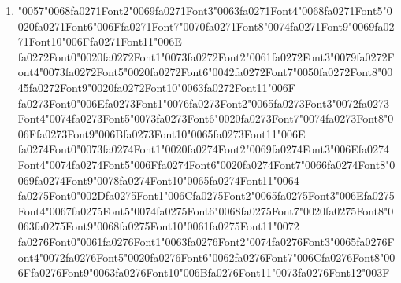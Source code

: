 \documentclass[12pt]{article}
\begin{document}
\begin{enumerate}[label=Q\arabic*.]
 \item {\char"0057}{\char"0068}{\csname fa0271Font2\endcsname\char"0069}{\csname fa0271Font3\endcsname\char"0063}{\csname fa0271Font4\endcsname\char"0068}{\csname fa0271Font5\endcsname\char"0020}{\csname fa0271Font6\endcsname\char"006F}{\csname fa0271Font7\endcsname\char"0070}{\csname fa0271Font8\endcsname\char"0074}{\csname fa0271Font9\endcsname\char"0069}{\csname fa0271Font10\endcsname\char"006F}{\csname fa0271Font11\endcsname\char"006E} {\csname fa0272Font0\endcsname\char"0020}{\csname fa0272Font1\endcsname\char"0073}{\csname fa0272Font2\endcsname\char"0061}{\csname fa0272Font3\endcsname\char"0079}{\csname fa0272Font4\endcsname\char"0073}{\csname fa0272Font5\endcsname\char"0020}{\csname fa0272Font6\endcsname\char"0042}{\csname fa0272Font7\endcsname\char"0050}{\csname fa0272Font8\endcsname\char"0045}{\csname fa0272Font9\endcsname\char"0020}{\csname fa0272Font10\endcsname\char"0063}{\csname fa0272Font11\endcsname\char"006F} {\csname fa0273Font0\endcsname\char"006E}{\csname fa0273Font1\endcsname\char"0076}{\csname fa0273Font2\endcsname\char"0065}{\csname fa0273Font3\endcsname\char"0072}{\csname fa0273Font4\endcsname\char"0074}{\csname fa0273Font5\endcsname\char"0073}{\csname fa0273Font6\endcsname\char"0020}{\csname fa0273Font7\endcsname\char"0074}{\csname fa0273Font8\endcsname\char"006F}{\csname fa0273Font9\endcsname\char"006B}{\csname fa0273Font10\endcsname\char"0065}{\csname fa0273Font11\endcsname\char"006E} {\csname fa0274Font0\endcsname\char"0073}{\csname fa0274Font1\endcsname\char"0020}{\csname fa0274Font2\endcsname\char"0069}{\csname fa0274Font3\endcsname\char"006E}{\csname fa0274Font4\endcsname\char"0074}{\csname fa0274Font5\endcsname\char"006F}{\csname fa0274Font6\endcsname\char"0020}{\csname fa0274Font7\endcsname\char"0066}{\csname fa0274Font8\endcsname\char"0069}{\csname fa0274Font9\endcsname\char"0078}{\csname fa0274Font10\endcsname\char"0065}{\csname fa0274Font11\endcsname\char"0064} {\csname fa0275Font0\endcsname\char"002D}{\csname fa0275Font1\endcsname\char"006C}{\csname fa0275Font2\endcsname\char"0065}{\csname fa0275Font3\endcsname\char"006E}{\csname fa0275Font4\endcsname\char"0067}{\csname fa0275Font5\endcsname\char"0074}{\csname fa0275Font6\endcsname\char"0068}{\csname fa0275Font7\endcsname\char"0020}{\csname fa0275Font8\endcsname\char"0063}{\csname fa0275Font9\endcsname\char"0068}{\csname fa0275Font10\endcsname\char"0061}{\csname fa0275Font11\endcsname\char"0072} {\csname fa0276Font0\endcsname\char"0061}{\csname fa0276Font1\endcsname\char"0063}{\csname fa0276Font2\endcsname\char"0074}{\csname fa0276Font3\endcsname\char"0065}{\csname fa0276Font4\endcsname\char"0072}{\csname fa0276Font5\endcsname\char"0020}{\csname fa0276Font6\endcsname\char"0062}{\csname fa0276Font7\endcsname\char"006C}{\csname fa0276Font8\endcsname\char"006F}{\csname fa0276Font9\endcsname\char"0063}{\csname fa0276Font10\endcsname\char"006B}{\csname fa0276Font11\endcsname\char"0073}{\csname fa0276Font12\endcsname\char"003F}

\end{enumerate}
\end{document}
